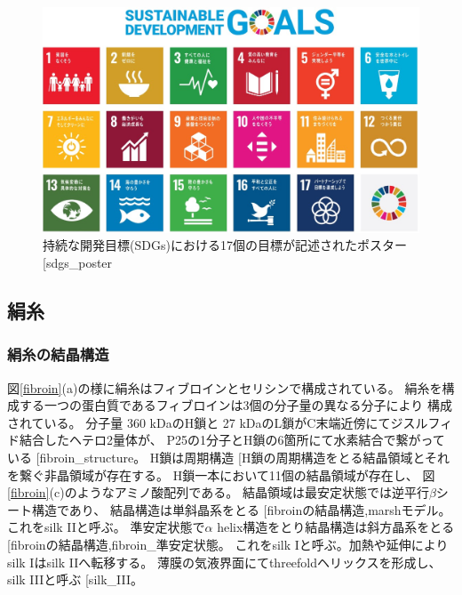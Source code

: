 \documentclass[dvipdfmx,12pt,a4paper]{jreport}
\makeatletter
\DeclareRobustCommand\cite{\unskip
    	\@ifnextchar[{\@tempswatrue\@citex}{\@tempswafalse\@citex[]}}
\makeatother
\begin{document}
		\begin{figure}[h]
			\centering
			\includegraphics[width=\linewidth]{sdgs_poster.jpg}
			\caption{持続な開発目標(SDGs)における17個の目標が記述されたポスター\cite{sdgs_poster}}
			\label{sdgs_poster}
		\end{figure}
		\newpage
		\subsection{絹糸}
		\subsubsection{絹糸の結晶構造}
		図\ref{fibroin}(a)の様に絹糸はフィブロインとセリシンで構成されている。
		絹糸を構成する一つの蛋白質であるフィブロインは3個の分子量の異なる分子により
		構成されている。
		分子量 360 kDaのH鎖と
		27 kDaのL鎖がC末端近傍にてジスルフィド結合したヘテロ2量体が、
		P25の1分子とH鎖の6箇所にて水素結合で繋がっている\cite{fibroin_structure}。
		H鎖は周期構造\cite{H鎖の周期構造}をとる結晶領域とそれを繋ぐ非晶領域が存在する。
		H鎖一本において11個の結晶領域が存在し、
		図\ref{fibroin}(c)のようなアミノ酸配列である。
		結晶領域は最安定状態では逆平行$\beta$シート構造であり、
		結晶構造は単斜晶系をとる\cite{fibroinの結晶構造,marshモデル}。
		これをsilk IIと呼ぶ。
		準安定状態で$\alpha$ helix構造をとり結晶構造は斜方晶系をとる\cite{fibroinの結晶構造,fibroin_準安定状態}。
		これをsilk Iと呼ぶ。加熱や延伸によりsilk Iはsilk IIへ転移する。
		薄膜の気液界面にてthreefoldヘリックスを形成し、silk IIIと呼ぶ\cite{silk_III}。
\end{document}

